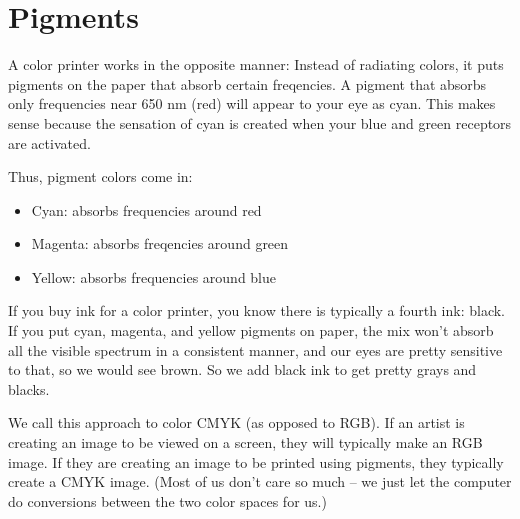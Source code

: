 \section{Pigments}

A color printer works in the opposite manner: Instead of radiating
colors, it puts pigments on the paper that absorb certain freqencies.
A pigment that absorbs only frequencies near 650 nm (red) will appear
to your eye as cyan. This makes sense because the sensation of cyan is
created when your blue and green receptors are activated.

Thus, pigment colors come in:
\begin{itemize}
\item Cyan: absorbs frequencies around red
\item Magenta: absorbs freqencies around green
\item Yellow: absorbs frequencies around blue
\end{itemize}

If you buy ink for a color printer, you know there is typically a
fourth ink: black. If you put cyan, magenta, and yellow pigments on
paper, the mix won't absorb all the visible spectrum in a consistent
manner, and our eyes are pretty sensitive to that, so we would see
brown. So we add black ink to get pretty grays and blacks.

We call this approach to color CMYK (as opposed to RGB). If an artist
is creating an image to be viewed on a screen, they will typically
make an RGB image.  If they are creating an image to be printed using
pigments, they typically create a CMYK image. (Most of us don't care
so much -- we just let the computer do conversions between the two
color spaces for us.)

